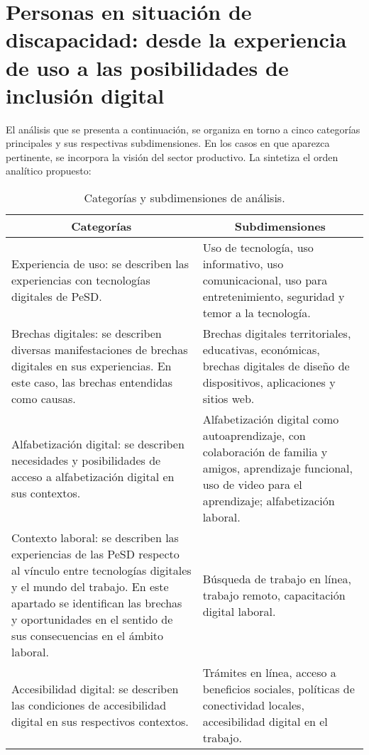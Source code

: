 \section{Personas en situación de discapacidad: desde la experiencia de
	uso a las posibilidades de inclusión digital}\label{sec-personasensituacióndediscapacidad}
	
El análisis que se presenta a continuación, se organiza en torno a cinco
categorías principales y sus respectivas subdimensiones. En los casos en
que aparezca pertinente, se incorpora la visión del sector productivo.
La  sintetiza el orden analítico propuesto:
	
\begin{table}[htpb]
\centering
\small
\begin{threeparttable}
\caption{Categorías y subdimensiones de análisis.}
\label{tab-03}
\begin{tabular}{p{} p{}}
\toprule
\multicolumn{1}{c}{Categorías} & \multicolumn{1}{c}{Subdimensiones}\\
\midrule
Experiencia de uso: se describen las experiencias con tecnologías
digitales de PeSD. & Uso de tecnología, uso informativo, uso
comunicacional, uso para entretenimiento, seguridad y temor a la
tecnología. \\
Brechas digitales: se describen diversas manifestaciones de brechas
digitales en sus experiencias. En este caso, las brechas entendidas como
causas. & Brechas digitales territoriales, educativas, económicas,
brechas digitales de diseño de dispositivos, aplicaciones y sitios
web. \\
Alfabetización digital: se describen necesidades y posibilidades de
acceso a alfabetización digital en sus contextos. & Alfabetización
digital como autoaprendizaje, con colaboración de familia y amigos,
aprendizaje funcional, uso de video para el aprendizaje; alfabetización
laboral. \\
Contexto laboral: se describen las experiencias de las PeSD respecto al
vínculo entre tecnologías digitales y el mundo del trabajo. En este
apartado se identifican las brechas y oportunidades en el sentido de sus
consecuencias en el ámbito laboral. & Búsqueda de trabajo en línea,
trabajo remoto, capacitación digital laboral. \\
Accesibilidad digital: se describen las condiciones de accesibilidad
digital en sus respectivos contextos. & Trámites en línea, acceso a
beneficios sociales, políticas de conectividad locales, accesibilidad
digital en el trabajo. \\
\bottomrule
\end{tabular}
\end{threeparttable}
\end{table}
	
